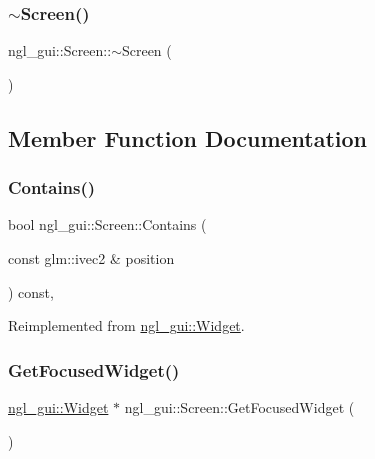 \subsubsection{\texorpdfstring{$\sim$\+Screen()}{~Screen()}}
{\footnotesize\ttfamily ngl\+\_\+gui\+::\+Screen\+::$\sim$\+Screen (\begin{DoxyParamCaption}{ }\end{DoxyParamCaption})}



\subsection{Member Function Documentation}
\mbox{\label{classngl__gui_1_1_screen_ac9e4f72e9a02a0df46f279076cfcef31}} 
\subsubsection{\texorpdfstring{Contains()}{Contains()}}
{\footnotesize\ttfamily bool ngl\+\_\+gui\+::\+Screen\+::\+Contains (\begin{DoxyParamCaption}\item[{const glm\+::ivec2 \&}]{position }\end{DoxyParamCaption}) const\hspace{0.3cm}{\ttfamily [override]}, {\ttfamily [virtual]}}



Reimplemented from \mbox{\hyperlink{classngl__gui_1_1_widget_a4199c5d671b55c1de6bcdd4ab2772080}{ngl\+\_\+gui\+::\+Widget}}.

\mbox{\label{classngl__gui_1_1_screen_aa6f79b5960a4a60afa9b221c203207a5}} 
\subsubsection{\texorpdfstring{Get\+Focused\+Widget()}{GetFocusedWidget()}}
{\footnotesize\ttfamily \mbox{\hyperlink{classngl__gui_1_1_widget}{ngl\+\_\+gui\+::\+Widget}} $\ast$ ngl\+\_\+gui\+::\+Screen\+::\+Get\+Focused\+Widget (\begin{DoxyParamCaption}{ }\end{DoxyParamCaption})}

